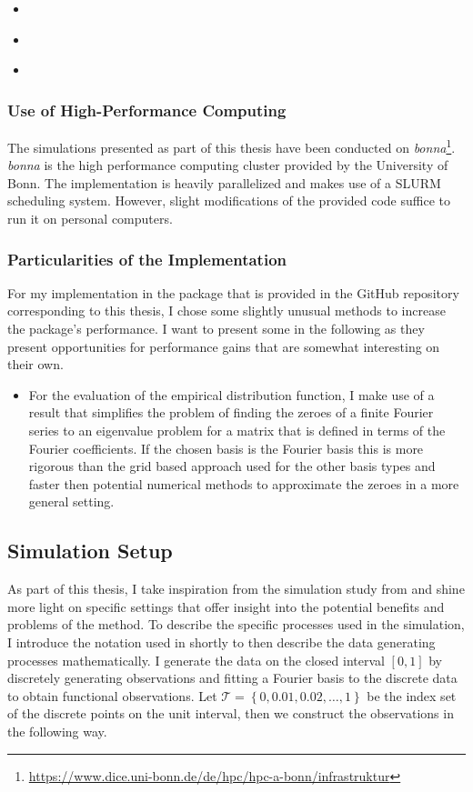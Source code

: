 \documentclass[12pt, a4paper]{article}
\theoremstyle{MAstyle} \newtheorem{assumption}{Assumption}[section]
\theoremstyle{MAstyle} \newtheorem{definition}{Definition}[section]
\theoremstyle{MAstyle} \newtheorem{theorem}{Theorem}[section]
\begin{document}
			\begin{itemize}
				\item \cite{fda}
				\item \cite{tidyverse}
				\item \cite{refund}
			\end{itemize}
			
		\subsubsection{Use of High-Performance Computing}
			The simulations presented as part of this thesis have been conducted on \textit{bonna}\footnote{\href{https://www.dice.uni-bonn.de/de/hpc/hpc-a-bonn/infrastruktur}{https://www.dice.uni-bonn.de/de/hpc/hpc-a-bonn/infrastruktur}}. \textit{bonna} is the high performance computing cluster provided by the University of Bonn. The implementation is heavily parallelized and makes use of a SLURM scheduling system. However, slight modifications of the provided code suffice to run it on personal computers.

		\subsubsection{Particularities of the Implementation}
			For my implementation in the package that is provided in the GitHub repository corresponding to this thesis, I chose some slightly unusual methods to increase the package's performance. I want to present some in the following as they present opportunities for performance gains that are somewhat interesting on their own.
			\begin{itemize}
				\item For the evaluation of the empirical distribution function, I make use of a result \cite{boyd_computing_2006} that simplifies the problem of finding the zeroes of a finite Fourier series to an eigenvalue problem for a matrix that is defined in terms of the Fourier coefficients. If the chosen basis is the Fourier basis this is more rigorous than the grid based approach used for the other basis types and faster then potential numerical methods to approximate the zeroes in a more general setting.
			\end{itemize}

		\subsection{Simulation Setup}
		As part of this thesis, I take inspiration from the simulation study from \cite{bugni_permutation_2021} and shine more light on specific settings that offer insight into the potential benefits and problems of the method. To describe the specific processes used in the simulation, I introduce the notation used in \cite{bugni_permutation_2021} shortly to then describe the data generating processes mathematically. I generate the data on the closed interval $\left[0,1\right]$ by discretely generating observations and fitting a Fourier basis to the discrete data to obtain functional observations. Let $\mathcal{T} = \left\{0, 0.01, 0.02, \dots, 1\right\}$ be the index set of the discrete points on the unit interval, then we construct the observations in the following way.
		
\end{document}
